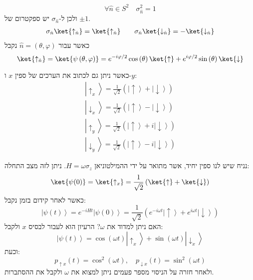 \documentclass{tstextbook}
\begin{document}
\begin{proposition}
$$\forall \hat{n} \in S^{2}\quad \sigma_{\hat{n}}^{2}=1$$
ולכן ל-\(\sigma_{\hat{n}}\) יש ספקטרום של \(\pm 1\).
$$\begin{gather}\sigma_{\hat{n}}\ket{\uparrow _{\hat{n}}} =\ket{\uparrow _{\hat{n}}} \qquad \sigma_{\hat{n}} \ket{\downarrow _{\hat{n}}} =-\ket{\downarrow _{\hat{n}}} 
\end{gather}$$
כאשר עבור \(\hat{n}=\left( \theta,\varphi \right)\) נקבל 
$$\ket{\uparrow_{\hat{n}}}=\ket{\psi\left( \theta,\varphi \right)}=e^{ -i\varphi/2 }\cos\left( \theta \right)\ket{\uparrow}+e^{  i \varphi/2 }\sin\left( \theta \right)\ket{\downarrow } $$

\end{proposition}
\begin{proposition}[ספין x ו-y]
כאשר ניתן גם לכתוב את הערכים של ספין \(x\) ו-\(y\):
$$\begin{array}{c}{{\left|\uparrow_{x}\right\rangle=\frac{1}{\sqrt{2}}\left(\left|\uparrow\right\rangle+\left|\downarrow\right\rangle\right)}}\\ {{\left|\downarrow_{x}\right\rangle=\frac{1}{\sqrt{2}}\left(\left|\uparrow\right\rangle-\left|\downarrow\right\rangle\right)}}\\{{\left|\uparrow_{y}\right\rangle=\frac{1}{\sqrt{2}}\left(\left|\uparrow\right\rangle+i\left|\downarrow\right\rangle\right)}}\\ {{\left|\downarrow_{y}\right\rangle=\frac{1}{\sqrt{2}}\left(\left|\uparrow\right\rangle-i\left|\downarrow\right\rangle\right)}}\end{array}$$

\end{proposition}
\begin{example}
נניח שיש לנו ספין יחיד, אשר מתואר על ידי ההמילטוניאן \(H=\omega \sigma_{z}\). ניתן לזה מצב התחלה:
$$\ket{\psi(0)} =\ket{\uparrow _{x}} = \frac{1}{\sqrt{ 2 }}\left( \ket{\uparrow } +\ket{\downarrow }  \right)$$
כאשר לאחר קידום בזמן נקבל:
$$\left|\psi\left(t\right)\right\rangle=e^{-i H t}\left|\psi\left(0\right)\right\rangle=\frac{1}{\sqrt{2}}\left(e^{-i\omega t}\left|\uparrow\right\rangle+e^{i\omega t}\left|\downarrow\right\rangle\right)$$
האם ניתן למדוד את \(\omega\)? הרעיון הוא לעבור לבסיס \(x\) ולקבל:
$$\left|\psi\left(t\right)\right\rangle=\cos\left(\omega t\right)\left|\uparrow_{x}\right\rangle+\sin\left(\omega t\right)\left|\downarrow_{x}\right\rangle$$
וכעת:
$$p_{\uparrow x}\left(t\right)=\cos^{2}\left(\omega t\right),\quad p_{\downarrow x}\left(t\right)=\sin^{2}\left(\omega t\right)$$
ולאחר חזרה על הניסוי מספר פעמים ניתן למצוא את \(\omega\) ולקבל את ההסתברות.

\end{example}
\end{document}
